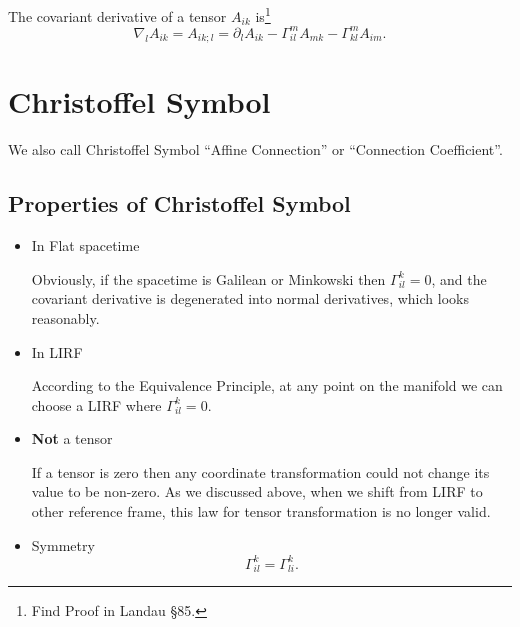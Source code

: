 \documentclass[openany,10pt]{book}
\theoremstyle{definition}
\theoremstyle{definition}
\theoremstyle{remark}
\begin{document}
The covariant derivative of a tensor $A_{ik}$ is\footnote{Find Proof in Landau \S85.}
\begin{equation}
    \nabla_l A_{ik}=A_{ik;l}=\partial_lA_{ik}-\Gamma^m_{il}A_{mk}-\Gamma^m_{kl}A_{im}.
\end{equation}















\section{Christoffel Symbol}\label{Christoffel}
We also call Christoffel Symbol ``Affine Connection'' or ``Connection Coefficient''.


\subsection{Properties of Christoffel Symbol}

\begin{itemize}
\item In Flat spacetime

Obviously,  if the spacetime is Galilean or Minkowski then $\Gamma^k_{il}=0$, and the covariant derivative is degenerated into normal derivatives, which looks reasonably.

\item In LIRF

  According to the Equivalence Principle, at any point on the manifold we can choose a LIRF where $\Gamma^k_{il}=0$.

    \item \textbf{Not} a tensor
    
    If a tensor is zero then any coordinate transformation could not change its value to be non-zero. As we discussed above, when we shift from LIRF to other reference frame, this  law for tensor transformation is no longer valid.
    
    \item Symmetry 
    \begin{equation}
        \Gamma^k_{il}=\Gamma^k_{li}.
    \end{equation}
    
\end{itemize}
\end{document}

